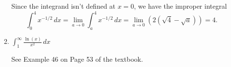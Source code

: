 \documentclass[12pt]{article}
\newcommand{\di}{\displaystyle}
\begin{document}
\begin{enumerate}
\begin{enumerate}
\bigskip

Since the integrand isn't defined at $x=0$, we have the improper integral
\[
 \int_0^4 x^{-1/2}\,dx= \lim_{a\to 0}\int_a^4x^{-1/2}\,dx = \lim_{a\to 0}(2(\sqrt{4}-\sqrt{a})) = 4.
\]


 \item $\di \int_1^\infty \frac{\ln(x)}{x^2}\,dx$

\bigskip

See Example 46 on Page 53 of the textbook.
\end{enumerate}

\end{enumerate}
\end{document}
